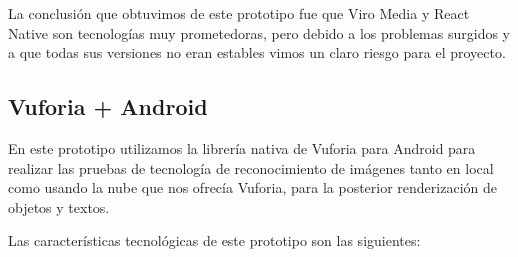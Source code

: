 La conclusión que obtuvimos de este prototipo fue que Viro Media y React Native son tecnologías muy prometedoras, pero debido a los
 problemas surgidos y a que todas sus versiones no eran estables vimos un claro riesgo para el proyecto.

\subsection{Vuforia + Android} 
\label{makereference4.1.3} 
 
En este prototipo utilizamos la librería nativa de Vuforia para Android para 
realizar las pruebas de tecnología de reconocimiento de imágenes tanto en  
local como usando la nube que nos ofrecía Vuforia, para la posterior renderización
de objetos y textos.

Las características tecnológicas de este prototipo son las siguientes:


